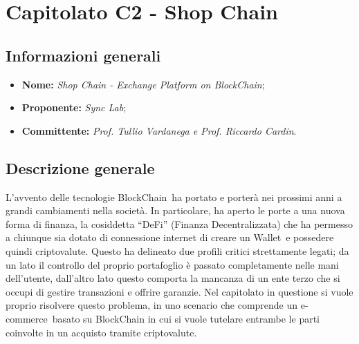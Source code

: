 \section{Capitolato C2 - Shop Chain}\label{section:c2}

\subsection{Informazioni generali}
\begin{itemize}
	\item \textbf{Nome:} \textit{Shop Chain - Exchange Platform on	BlockChain};
	\item \textbf{Proponente:} \textit{Sync Lab};
	\item \textbf{Committente:} \textit{Prof. Tullio Vardanega e Prof. Riccardo Cardin}.
\end{itemize}

\subsection{Descrizione generale}
L'avvento delle tecnologie BlockChain\glo\ ha portato e porterà nei prossimi anni a grandi cambiamenti nella società. 
In particolare, ha aperto le porte a una nuova forma di finanza, la cosiddetta “DeFi” (Finanza Decentralizzata) che ha permesso a chiunque sia dotato di connessione internet di creare un Wallet\glo\ e possedere quindi criptovalute\glo.
Questo ha delineato due profili critici strettamente legati; da un lato il controllo del proprio portafoglio è passato completamente nelle mani dell'utente, dall'altro lato questo comporta la mancanza di un ente terzo che si occupi di gestire transazioni e offrire garanzie.
\newline
Nel capitolato in questione si vuole proprio risolvere questo problema, in uno scenario che comprende un e-commerce\glo\ basato su BlockChain in cui si vuole tutelare entrambe le parti coinvolte in un acquisto tramite criptovalute.

